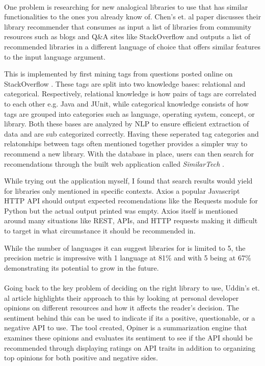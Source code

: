 \documentclass[12pt]{article}
\begin{document}
\paragraph{}
One problem is researching for new analogical libraries to use that has similar functionalities 
to the ones you already know of. Chen's et. al \cite{analogical} paper discusses their library recommender 
that consumes as input a list of libraries from community resources such as blogs and Q\&A sites like StackOverflow \cite{stackoverflow} 
and outputs a list of recommended libraries in a different language of choice that offers similar features to the input language argument. 

This is implemented by first mining tags from questions posted online on StackOverflow \cite{stackoverflow}.
These tags are split into two knowledge bases: relational and categorical. Respectively, relational knowledge is how pairs of
tags are correlated to each other e.g. Java and JUnit, while categorical knowledge consists of 
how tags are grouped into categories such as language, operating system, concept, or library. 
Both these bases are analyzed by NLP to ensure efficient extraction of data and are sub categorized correctly.
Having these seperated tag categories and relatonships between tags often mentioned together provides 
a simpler way to recommend a new library. 
With the database in place, users can then search for recomendations through the built
web application called \textit{SimilarTech} \cite{similartech}.

While trying out the application myself, I found that search results would yield for libraries only mentioned in specific contexts.
Axios \cite{axios} a popular Javascript HTTP API should output expected recomendations 
like the Requests \cite{requests} module for Python but the actual output printed was empty.
Axios \cite{axios} itself is mentioned around many situations like REST, APIs, and HTTP requests making it difficult to target in what circumstance
it should be recommended in.

While the number of languages it can suggest libraries for is limited to 5, the precision metric is impressive
with 1 language at 81\% and with 5 being at 67\% demonstrating its potential to grow in the future.

\paragraph{}
Going back to the key problem of deciding on the right library to use, Uddin's et. al \cite{opinerarticle} article
highlights their approach to this by looking at personal developer opinions on different resources
and how it affects the reader's decision. The sentiment behind this can be used to indicate if its 
a positive, questionable, or a negative API to use. The tool created, Opiner \cite{opiner} is a summarization engine
that examines these opinions and evaluates its sentiment to see if the API should be recommended through 
displaying ratings on API traits in addition to organizing top opinions for both positive and negative sides. 
\end{document}

